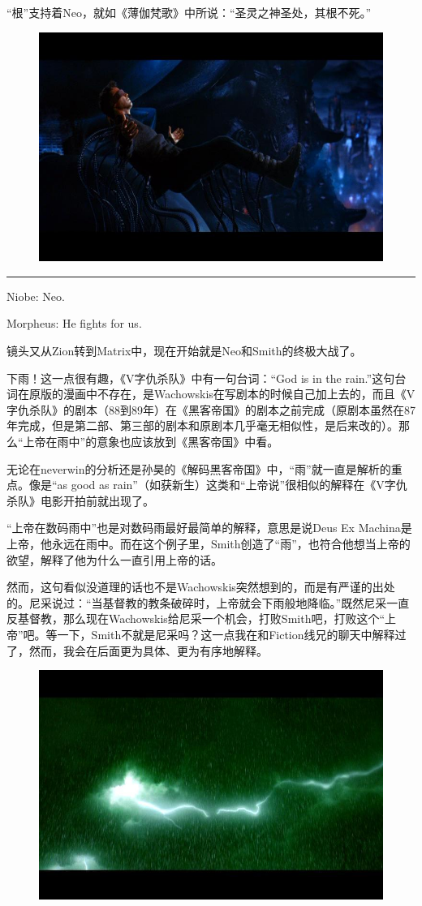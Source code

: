 \documentclass[UTF8]{ctexart}
\newcommand{\myparsep}{\noindent \rule[0.5ex]{\linewidth}{1pt}}
\newenvironment{myquote}{\color{green} \setlength{\leftskip}{6em} \setlength{\rightskip}{4em} \setlength{\parindent}{-2em}}{\par}
\begin{document}
“根”支持着Neo，就如《薄伽梵歌》中所说：“圣灵之神圣处，其根不死。”

\begin{figure}[htb]
\centering
\includegraphics[width=0.5\linewidth]{fig/42486159847ef02b2834f0d3.jpg}
\end{figure}

\myparsep

\begin{myquote}
Niobe: Neo.

Morpheus: He fights for us.
\end{myquote}

镜头又从Zion转到Matrix中，现在开始就是Neo和Smith的终极大战了。

下雨！这一点很有趣，《V字仇杀队》中有一句台词：“God is in the rain.”这句台词在原版的漫画中不存在，是Wachowskis在写剧本的时候自己加上去的，而且《V字仇杀队》的剧本（88到89年）在《黑客帝国》的剧本之前完成（原剧本虽然在87年完成，但是第二部、第三部的剧本和原剧本几乎毫无相似性，是后来改的）。那么“上帝在雨中”的意象也应该放到《黑客帝国》中看。

无论在neverwin的分析还是孙昊的《解码黑客帝国》中，“雨”就一直是解析的重点。像是“as good as rain”（如获新生）这类和“上帝说”很相似的解释在《V字仇杀队》电影开拍前就出现了。

“上帝在数码雨中”也是对数码雨最好最简单的解释，意思是说Deus Ex Machina是上帝，他永远在雨中。而在这个例子里，Smith创造了“雨”，也符合他想当上帝的欲望，解释了他为什么一直引用上帝的话。

然而，这句看似没道理的话也不是Wachowskis突然想到的，而是有严谨的出处的。尼采说过：“当基督教的教条破碎时，上帝就会下雨般地降临。”既然尼采一直反基督教，那么现在Wachowskis给尼采一个机会，打败Smith吧，打败这个“上帝”吧。等一下，Smith不就是尼采吗？这一点我在和Fiction线兄的聊天中解释过了，然而，我会在后面更为具体、更为有序地解释。

\begin{figure}[htb]
\centering
\includegraphics[width=0.5\linewidth]{fig/39cd2fdd6b9f58d88d1029d3.jpg}
\end{figure}
\end{document}
